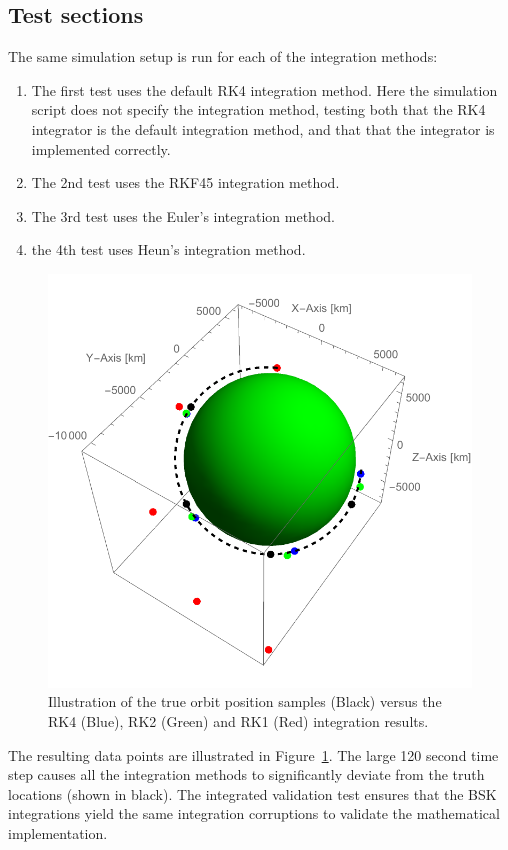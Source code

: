 \subsection{Test sections}
The same simulation setup is run for each of the integration methods:
\begin{enumerate}
\item The first test uses the default RK4 integration method.  Here the simulation script does not specify the integration method, testing both that the RK4 integrator is the default integration method, and that that the integrator is implemented correctly.

\item The 2nd test uses the RKF45 integration method.

\item The 3rd test uses the Euler's integration method.

\item the 4th test uses Heun's integration method.

\end{enumerate}

\begin{figure}[t]
	\centerline{
	\includegraphics[]{Figures/intResults}
	}
	\caption{Illustration of the true orbit position samples (Black) versus the RK4 (Blue), RK2 (Green) and RK1 (Red) integration results.}
	\label{fig:intResults}
\end{figure}
The resulting data points are illustrated in Figure~\ref{fig:intResults}.  The large 120 second time step causes all the integration methods to significantly deviate from the truth locations (shown in black).  The integrated validation test ensures that the BSK integrations yield the same integration corruptions to validate the mathematical implementation.

